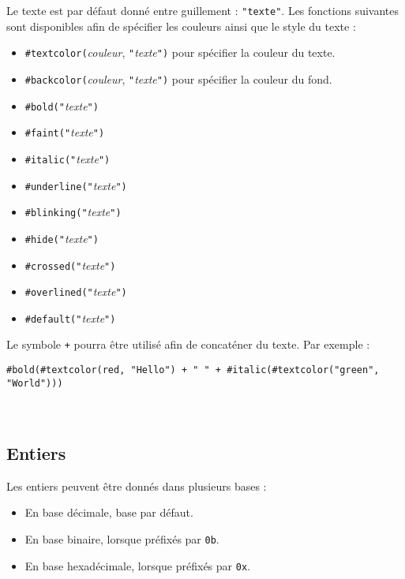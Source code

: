 \documentclass[french, 12pt]{article}
\begin{document}
Le texte est par défaut donné entre guillement : \texttt{"texte"}. Les
fonctions suivantes sont disponibles afin de spécifier les couleurs ainsi que
le style du texte :
\begin{itemize}
      \item \texttt{\#textcolor(}\textit{couleur}, \texttt{"}\textit{texte}\texttt{")} pour spécifier la couleur du texte.
      \item \texttt{\#backcolor(}\textit{couleur}, \texttt{"}\textit{texte}\texttt{")} pour spécifier la couleur du fond.
      \item \texttt{\#bold(}\texttt{"}\textit{texte}\texttt{")}
      \item \texttt{\#faint(}\texttt{"}\textit{texte}\texttt{")}
      \item \texttt{\#italic(}\texttt{"}\textit{texte}\texttt{")}
      \item \texttt{\#underline(}\texttt{"}\textit{texte}\texttt{")}
      \item \texttt{\#blinking(}\texttt{"}\textit{texte}\texttt{")}
      \item \texttt{\#hide(}\texttt{"}\textit{texte}\texttt{")}
      \item \texttt{\#crossed(}\texttt{"}\textit{texte}\texttt{")}
      \item \texttt{\#overlined(}\texttt{"}\textit{texte}\texttt{")}
      \item \texttt{\#default(}\texttt{"}\textit{texte}\texttt{")}
\end{itemize}

Le symbole \texttt{+} pourra être utilisé afin de concaténer du texte.
Par exemple :
\begin{center}
      \noindent\texttt{\#bold(\#textcolor(red, "Hello") + " " + \#italic(\#textcolor("green", "World")))}  \\
      \textdownarrow\\
      \noindent\texttt{\textbf{\color{red}{Hello}} \textit{\color{green}{World}}}
\end{center}

\subsection*{Entiers}

Les entiers peuvent être donnés dans plusieurs bases :
\begin{itemize}
      \item En base décimale, base par défaut.
      \item En base binaire, lorsque préfixés par \texttt{0b}.
      \item En base hexadécimale, lorsque préfixés par \texttt{0x}.
\end{itemize}
\end{document}
